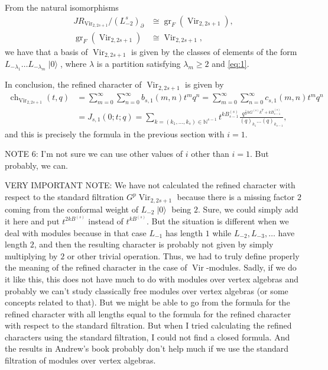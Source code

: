 \documentclass[a4paper, 12pt, reqno]{amsart}
\DeclareMathOperator{\Vir}{Vir}
\DeclareMathOperator{\ch}{ch}
\DeclareMathOperator{\vac}{|0\rangle}
\DeclareMathOperator{\gr}{gr}
\begin{document}
From the natural isomorphisms
\begin{align*}
  JR_{\Vir_{2, 2s + 1}}/(L_{-2}^s)_{\partial} &\cong \gr_F(\Vir_{2, 2s + 1}), \\
  \gr_F(\Vir_{2, 2s + 1}) &\cong \Vir_{2, 2s + 1},
\end{align*}
we have that a basis of $\Vir_{2, 2s + 1}$ is given by the classes of elements of the form $L_{-\lambda_1}\dots L_{-\lambda_m}\vac$, where $\lambda$ is a partition satisfying $\lambda_m \ge 2$ and \eqref{eq:1}.

In conclusion, the refined character of $\Vir_{2, 2s + 1}$ is given by 
\begin{align*}
  \ch_{\Vir_{2, 2s + 1}}(t, q) &= \sum_{m = 0}^{\infty}\sum_{n = 0}^{\infty}b_{s, 1}(m, n)t^mq^n = \sum_{m = 0}^{\infty}\sum_{n = 0}^{\infty}c_{s, 1}(m, n)t^mq^n \\
                               &= J_{s, 1}(0; t; q) = \sum_{k = (k_1, \dots, k_s) \in \mathbb{N}^{s - 1}}t^{kB^{(s)}_{s - 1}}\frac{q^{\frac{1}{2}kG^{(s)}k^T + kB^{(s)}_{s - 1}}}{(q)_{k_1}\dots(q)_{k_{s - 1}}},
\end{align*}
and this is precisely the formula in the previous section with $i = 1$.

NOTE 6: I'm not sure we can use other values of $i$ other than $i = 1$.
But probably, we can.

VERY IMPORTANT NOTE: We have not calculated the refined character with respect to the standard filtration $G^p\Vir_{2, 2s + 1}$ because there is a missing factor $2$ coming from the conformal weight of $L_{-2}\vac$ being $2$.
Sure, we could simply add it here and put $t^{2kB^{(s)}}$ instead of $t^{kB^{(s)}}$.
But the situation is different when we deal with modules because in that case $L_{-1}$ has length $1$ while $L_{-2}, L_{-3}, \dots$ have length $2$, and then the resulting character is probably not given by simply multiplying by $2$ or other trivial operation.
Thus, we had to truly define properly the meaning of the refined character in the case of $\Vir$-modules.
Sadly, if we do it like this, this does not have much to do with modules over vertex algebras and probably we can't study classically free modules over vertex algebras (or some concepts related to that).
But we might be able to go from the formula for the refined character with all lengths equal to the formula for the refined character with respect to the standard filtration.
But when I tried calculating the refined characters using the standard filtration, I could not find a closed formula.
And the results in Andrew's book probably don't help much if we use the standard filtration of modules over vertex algebras.
\end{document}
